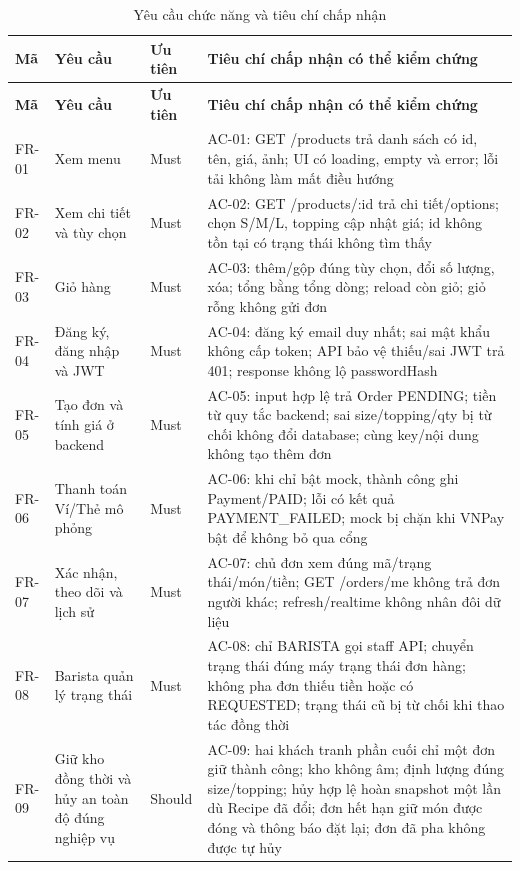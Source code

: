 \begingroup\footnotesize\setlength{\tabcolsep}{3pt}
\begin{longtable}{|>{\raggedright\arraybackslash}p{}|>{\raggedright\arraybackslash}p{}|>{\raggedright\arraybackslash}p{}|>{\raggedright\arraybackslash}p{}|}
\caption{Yêu cầu chức năng và tiêu chí chấp nhận}\\\hline
\textbf{Mã} & \textbf{Yêu cầu} & \textbf{Ưu tiên} & \textbf{Tiêu chí chấp nhận có thể kiểm chứng} \\ \hline
\endfirsthead
\hline
\textbf{Mã} & \textbf{Yêu cầu} & \textbf{Ưu tiên} & \textbf{Tiêu chí chấp nhận có thể kiểm chứng} \\ \hline
\endhead
FR-01 & Xem menu& Must & AC-01: GET /products trả danh sách có id, tên, giá, ảnh; UI có loading, empty và error; lỗi tải không làm mất điều hướng \\ \hline
FR-02 & Xem chi tiết và tùy chọn& Must & AC-02: GET /products/:id trả chi tiết/options; chọn S/M/L, topping cập nhật giá; id không tồn tại có trạng thái không tìm thấy \\ \hline
FR-03 & Giỏ hàng& Must & AC-03: thêm/gộp đúng tùy chọn, đổi số lượng, xóa; tổng bằng tổng dòng; reload còn giỏ; giỏ rỗng không gửi đơn \\ \hline
FR-04 & Đăng ký, đăng nhập và JWT& Must & AC-04: đăng ký email duy nhất; sai mật khẩu không cấp token; API bảo vệ thiếu/sai JWT trả 401; response không lộ passwordHash \\ \hline
FR-05 & Tạo đơn và tính giá ở backend& Must & AC-05: input hợp lệ trả Order PENDING; tiền từ quy tắc backend; sai size/topping/qty bị từ chối không đổi database; cùng key/nội dung không tạo thêm đơn \\ \hline
FR-06 & Thanh toán Ví/Thẻ mô phỏng& Must & AC-06: khi chỉ bật mock, thành công ghi Payment/PAID; lỗi có kết quả PAYMENT\_FAILED; mock bị chặn khi VNPay bật để không bỏ qua cổng \\ \hline
FR-07 & Xác nhận, theo dõi và lịch sử& Must & AC-07: chủ đơn xem đúng mã/trạng thái/món/tiền; GET /orders/me không trả đơn người khác; refresh/realtime không nhân đôi dữ liệu \\ \hline
FR-08 & Barista quản lý trạng thái& Must & AC-08: chỉ BARISTA gọi staff API; chuyển trạng thái đúng máy trạng thái đơn hàng; không pha đơn thiếu tiền hoặc có REQUESTED; trạng thái cũ bị từ chối khi thao tác đồng thời \\ \hline
FR-09 & Giữ kho đồng thời và hủy an toàn độ đúng nghiệp vụ & Should & AC-09: hai khách tranh phần cuối chỉ một đơn giữ thành công; kho không âm; định lượng đúng size/topping; hủy hợp lệ hoàn snapshot một lần dù Recipe đã đổi; đơn hết hạn giữ món được đóng và thông báo đặt lại; đơn đã pha không được tự hủy \\ \hline

\end{longtable}
